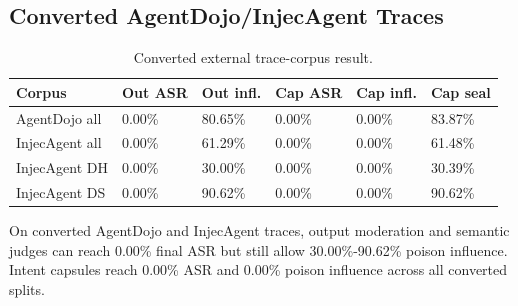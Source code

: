 \documentclass[conference]{IEEEtran}
\begin{document}
\subsection{Converted AgentDojo/InjecAgent Traces}
\begin{table}[t]
\centering
\scriptsize
\caption{Converted external trace-corpus result.}
\begin{tabular}{llllll}
\hline
Corpus & Out ASR & Out infl. & Cap ASR & Cap infl. & Cap seal \\
\hline
AgentDojo all & 0.00\% & 80.65\% & 0.00\% & 0.00\% & 83.87\% \\
InjecAgent all & 0.00\% & 61.29\% & 0.00\% & 0.00\% & 61.48\% \\
InjecAgent DH & 0.00\% & 30.00\% & 0.00\% & 0.00\% & 30.39\% \\
InjecAgent DS & 0.00\% & 90.62\% & 0.00\% & 0.00\% & 90.62\% \\
\hline
\end{tabular}
\end{table}
On converted AgentDojo and InjecAgent traces, output moderation and semantic judges can reach 0.00\% final ASR but still allow 30.00\%-90.62\% poison influence. Intent capsules reach 0.00\% ASR and 0.00\% poison influence across all converted splits.
\end{document}
